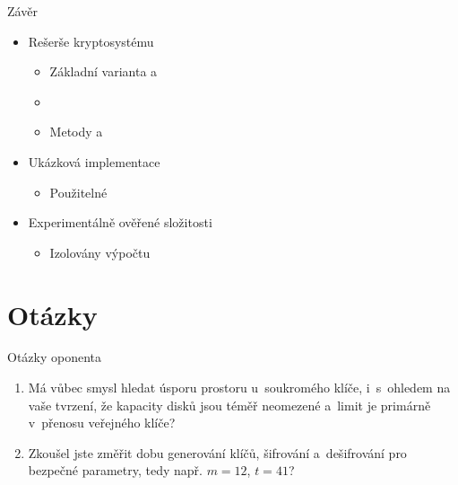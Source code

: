 \documentclass{beamer}
\begin{document}
\begin{frame}{Závěr}

    \begin{itemize}
        \item Rešerše kryptosystému
            \begin{itemize}
                \item Základní varianta a 
                \item {}
                \item Metody  a 
            \end{itemize}

        \item Ukázková implementace
            \begin{itemize}
                \item Použitelné 
            \end{itemize}

        \item Experimentálně ověřené složitosti
            \begin{itemize}
                \item Izolovány  výpočtu
            \end{itemize}

    \end{itemize}
\end{frame}


\appendix

\section{Otázky}
\begin{frame}{Otázky oponenta}
    \begin{enumerate}

        \item Má vůbec smysl hledat úsporu prostoru u~soukromého klíče,
            i~s~ohledem na vaše tvrzení, že kapacity disků jsou téměř neomezené
            a~limit je primárně v~přenosu veřejného klíče?

        \item Zkoušel jste změřit dobu generování klíčů, šifrování a~dešifrování
            pro bezpečné parametry, tedy např. $m=12$, $t=41$?

    \end{enumerate}
\end{frame}
\end{document}
